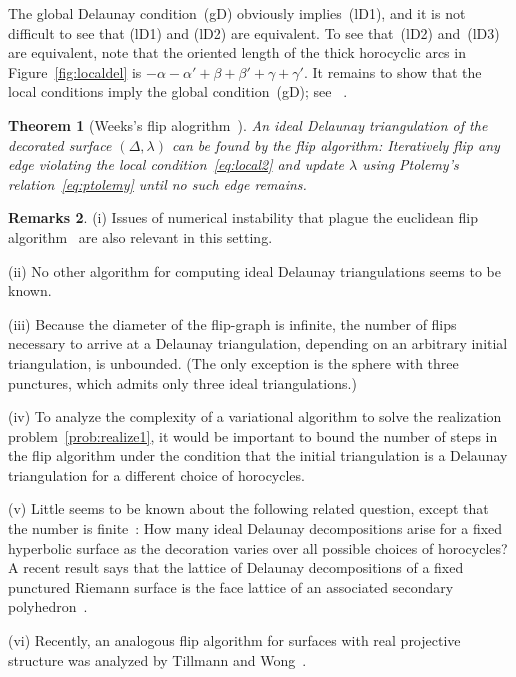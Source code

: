 \documentclass[a4paper, 11pt]{article}
\theoremstyle{plain}
\newtheorem{theorem}{Theorem}[section]
\theoremstyle{definition}
\newtheorem{remarks}[theorem]{Remarks}
\begin{document}
The global Delaunay condition~(gD) obviously implies~(lD1), and it is
not difficult to see that (lD1) and (lD2) are equivalent. To see
that~(lD2) and~(lD3) are equivalent, note that the oriented length of
the thick horocyclic arcs in Figure~\ref{fig:localdel} is
$-\alpha-\alpha'+\beta+\beta'+\gamma+\gamma'$. It remains to show that
the local conditions imply the global condition~(gD);
see~\cite[Theorem~5.1]{penner87} \cite[p.~128]{penner12}.

\begin{theorem}[Weeks's flip alogrithm~\cite{weeks93}]
  \label{thm:flip}
  An ideal Delaunay triangulation of the decorated surface
  $(\Delta,\lambda)$ can be found by the flip algorithm: Iteratively
  flip any edge violating the local condition~\eqref{eq:local2} and
  update $\lambda$ using Ptolemy's relation~\eqref{eq:ptolemy} until
  no such edge remains.
\end{theorem}

\begin{remarks}%
  \label{rem:flip}
  (i) Issues of numerical instability that plague the euclidean flip
  algorithm~\cite{edelsbrunner01,fortune95} are also relevant
  in this setting.

  (ii) No other algorithm for computing ideal Delaunay
  triangulations seems to be known.

  (iii) Because the diameter of the flip-graph is infinite, the number
  of flips necessary to arrive at a Delaunay triangulation, depending
  on an arbitrary initial triangulation, is unbounded. (The only
  exception is the sphere with three punctures, which admits only
  three ideal triangulations.)

  (iv) To analyze the complexity of a variational algorithm to solve
  the realization problem~\ref{prob:realize1}, it would be important
  to bound the number of steps in the flip algorithm under the
  condition that the initial triangulation is a Delaunay triangulation
  for a different choice of horocycles.

  (v) Little seems to be known about the following related
  question, except that the number is finite~\cite{akiyoshi01}: How
  many ideal Delaunay decompositions arise for a fixed hyperbolic
  surface as the decoration varies over all possible choices of
  horocycles? A recent result says that the lattice of Delaunay
  decompositions of a fixed punctured Riemann surface is the face
  lattice of an associated secondary polyhedron~\cite{loewe}.

  (vi) Recently, an analogous flip algorithm for surfaces with real projective
  structure was analyzed by Tillmann and Wong~\cite{tillmannwong:2016}.
\end{remarks}
\end{document}
